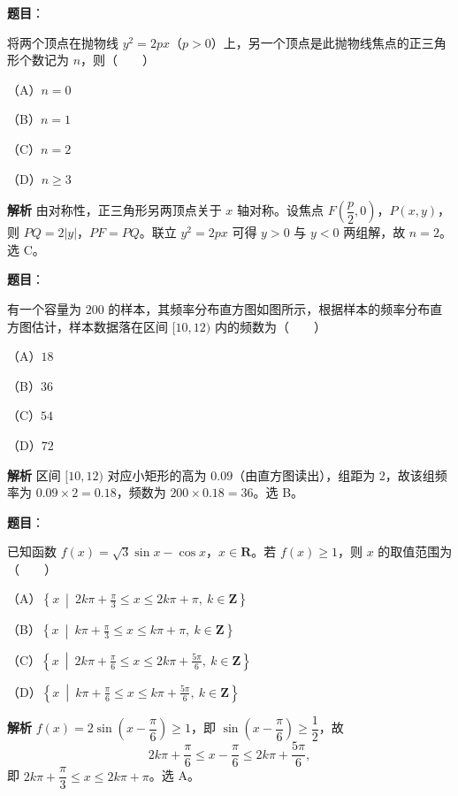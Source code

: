 \begin{answer}

\textbf{题目}：

将两个顶点在抛物线 $y^2=2px$（$p>0$）上，另一个顶点是此抛物线焦点的正三角形个数记为 $n$，则\mbox{（　　）}

（A）$n=0$

（B）$n=1$

（C）$n=2$

（D）$n\geqslant3$

\textbf{解析}
由对称性，正三角形另两顶点关于 $x$ 轴对称。设焦点 $F\left(\dfrac p2,0\right)$，$P(x,y)$，则 $PQ=2|y|$，$PF=PQ$。联立 $y^2=2px$ 可得 $y>0$ 与 $y<0$ 两组解，故 $n=2$。选 C。


\end{answer}
\begin{answer}

\textbf{题目}：

有一个容量为 $200$ 的样本，其频率分布直方图如图所示，根据样本的频率分布直方图估计，样本数据落在区间 $[10,12)$ 内的频数为\mbox{（　　）}

（A）$18$

（B）$36$

（C）$54$

（D）$72$
\nopagebreak[4]
\begin{center}\end{center}
\nopagebreak[4]
\textbf{解析}
区间 $[10,12)$ 对应小矩形的高为 $0.09$（由直方图读出），组距为 $2$，故该组频率为 $0.09\times2=0.18$，频数为 $200\times0.18=36$。选 B。


\end{answer}
\begin{answer}

\textbf{题目}：

已知函数 $f(x)=\sqrt3\sin x-\cos x$，$x\in\mathbf R$。若 $f(x)\geqslant1$，则 $x$ 的取值范围为\mbox{（　　）}

（A）$\left\{x\ \middle|\ 2k\pi+\frac\pi3\leqslant x\leqslant2k\pi+\pi,\ k\in\mathbf Z\right\}$

（B）$\left\{x\ \middle|\ k\pi+\frac\pi3\leqslant x\leqslant k\pi+\pi,\ k\in\mathbf Z\right\}$

（C）$\left\{x\ \middle|\ 2k\pi+\frac\pi6\leqslant x\leqslant2k\pi+\frac{5\pi}6,\ k\in\mathbf Z\right\}$

（D）$\left\{x\ \middle|\ k\pi+\frac\pi6\leqslant x\leqslant k\pi+\frac{5\pi}6,\ k\in\mathbf Z\right\}$

\textbf{解析}
$f(x)=2\sin\left(x-\dfrac\pi6\right)\geqslant1$，即 $\sin\left(x-\dfrac\pi6\right)\geqslant\dfrac12$，故
\nopagebreak[4]
\[2k\pi+\frac\pi6\leqslant x-\frac\pi6\leqslant2k\pi+\frac{5\pi}6,\]
即 $2k\pi+\dfrac\pi3\leqslant x\leqslant2k\pi+\pi$。选 A。


\end{answer}
